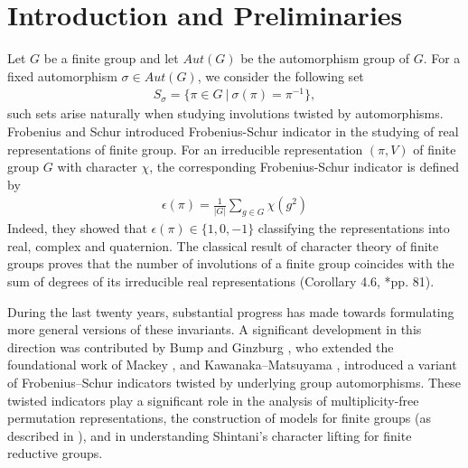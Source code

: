 \documentclass{amsart}
\theoremstyle{definition}
\theoremstyle{remark}
\newcommand{\Aut}{Aut}
\numberwithin{equation}{section}
\begin{document}
    \section{Introduction and Preliminaries}
	
	Let $G$ be a finite group and let $\Aut(G)$ be the automorphism group of $G$. For a fixed automorphism $\sigma \in \Aut(G)$, we consider the following set 
	\begin{align*}
		S_{\sigma} = \{\pi \in G \ | \ \sigma(\pi) = \pi^{-1}\},
	\end{align*}
	such sets arise naturally when studying involutions twisted by automorphisms. Frobenius and Schur \cite{zbMATH02646565} introduced Frobenius-Schur indicator in the studying of real representations of finite group. For an irreducible representation $(\pi, V)$ of finite group $G$ with character $\chi$, the corresponding Frobenius-Schur indicator is defined by
    \begin{align}
        \epsilon(\pi) = \frac{1}{|G|}\sum_{g \in G}\chi(g^2)
    \end{align}
    Indeed, they showed that $\epsilon(\pi) \in \{1, 0, -1\}$ classifying the representations into real, complex and quaternion. The classical result of character theory of finite groups  proves that the number of involutions of a finite group coincides with the sum of degrees of its irreducible real representations (Corollary 4.6, \cite{MR2270898}*{pp. 81}).

    
    
    During the last twenty years, substantial progress has made towards formulating more general versions of these invariants. A significant development in this direction was contributed by Bump and Ginzburg \cite{MR2068079}, who extended the foundational work of Mackey \cite{MR100035}, and Kawanaka–Matsuyama \cite{MR1078503}, introduced  a variant of Frobenius–Schur indicators twisted by underlying group automorphisms. These twisted indicators play a significant role in the analysis of multiplicity-free permutation representations, the construction of models for finite groups (as described in \cite{MR414792}), and in understanding Shintani’s character lifting for finite reductive groups.
\end{document}
